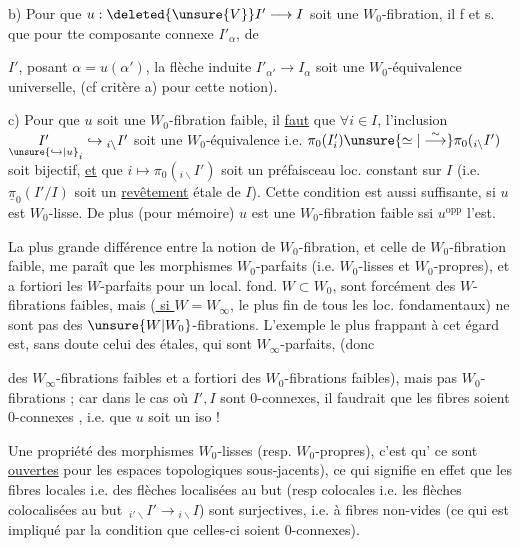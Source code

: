 b) Pour que $u:\deleted{\unsure{V}}I'\longrightarrow I$ soit une $W_0$-fibration, il f et s. que pour tte composante connexe $I'_\alpha$, de

$I'$, posant $\alpha=u(\alpha')$, la flèche induite $I'_{\alpha'}\longrightarrow I_\alpha$ soit une $W_0$-équivalence universelle,  (cf critère a) pour cette notion).

c) Pour que $u$ soit une $W_0$-fibration faible, il \uline{faut} que $\forall i\in I$, l'inclusion $\underset{\unsure{\hookrightarrow|u}}{I'}_i\hookrightarrow{}_{i\backslash}I'$ soit une $W_0$-équivalence i.e. $\pi_0(I'_i)\unsure{\simeq|\stackrel{\sim}{\longrightarrow}}\pi_0({}_{i\backslash}I')$ soit bijectif, \uline{et} que $i\longmapsto\pi_0({}_{i\backslash}I')$ soit un préfaisceau loc. constant sur $I$ (i.e. $\underline{\pi}_0(I'/I)$ soit un \uline{revêtement} étale de $I$). Cette condition est aussi suffisante, si $u$ est $W_0$-lisse.  De plus (pour mémoire) $u$ est une $W_0$-fibration faible ssi $u^{\mathrm{opp}}$ l'est.

La plus grande différence entre la notion de $W_0$-fibration, et celle de $W_0$-fibration faible, me paraît que les morphismes $W_0$-parfaits (i.e. $W_0$-lisses et $W_0$-propres), et a fortiori les $W$-parfaits  pour un local. fond. $W\subset W_0$, sont forcément des $W$-fibrations faibles, mais (\uline{ si $W=W_\infty$}, le plus fin de tous les loc. fondamentaux)  ne sont pas des $\unsure{W|W_0}$-fibrations. L'exemple le plus frappant à cet égard est, sans doute celui des  étales, qui sont $W_\infty$-parfaits, (donc

des $W_\infty$-fibrations faibles et a fortiori des $W_0$-fibrations faibles), mais pas  $W_0$-fibrations ; car dans le cas où $I',I$ sont $0$-connexes, il faudrait que les fibres soient $0$-connexes , i.e. que $u$ soit un iso !

Une propriété  des morphismes $W_0$-lisses (resp. $W_0$-propres), c'est qu' ce sont   \uline{ouvertes}  pour les espaces topologiques sous-jacents), ce qui signifie en effet que les fibres locales i.e. des flèches localisées au but  (resp colocales i.e. les flèches colocalisées au but $\,{}_{i'\backslash}I'\longrightarrow{}_{i\backslash}I$) sont surjectives, i.e. à fibres non-vides (ce qui est impliqué par la condition que celles-ci soient $0$-connexes).

